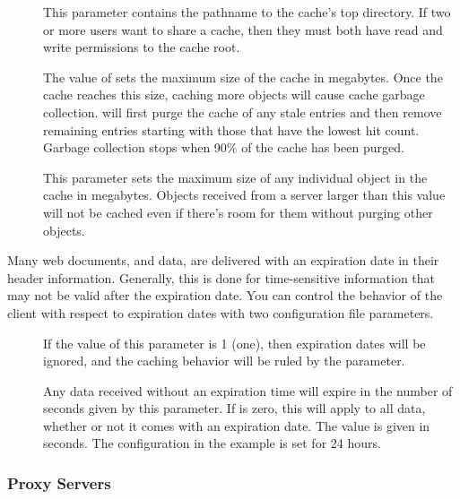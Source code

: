 \begin{description}
\item[] This parameter contains the pathname to the
  cache's top directory.  If two or more users want to share a cache,
  then they must both have read and write permissions to the cache
  root.

\item[] The value of  sets
  the maximum size of the cache in megabytes.  Once the cache reaches
  this size, caching more objects will cause cache garbage collection.
  \opendap will first purge the cache of any stale entries and then remove
  remaining entries starting with those that have the lowest hit
  count. Garbage collection stops when 90\% of the cache has been
  purged.
  
\item[] This parameter sets the maximum size of
  any individual object in the cache in megabytes. Objects received
  from a server larger than this value will not be cached even if
  there's room for them without purging other objects.
  
\end{description}

Many web documents, and \opendap data, are delivered with an expiration
date in their header information.  Generally, this is done for
time-sensitive information that may not be valid after the expiration
date.  You can control the behavior of the \opendap client with respect to
expiration dates with two configuration file parameters.

\begin{description}
\item[] If the value of this parameter is 1
  (one), then expiration dates will be ignored, and the caching
  behavior will be ruled by the  parameter.

\item[] Any data received without an expiration
  time will expire in the number of seconds given by this parameter.
  If  is zero, this will apply to all data,
  whether or not it comes with an expiration date.  The value is given
  in seconds.  The configuration in the example is set for 24 hours.

\end{description}

\subsubsection{Proxy Servers}

